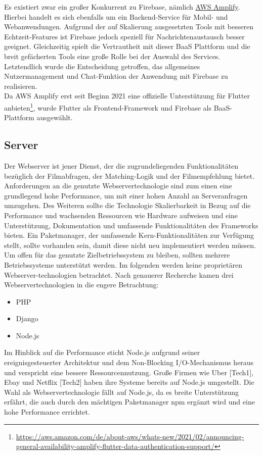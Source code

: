 Es existiert zwar ein großer Konkurrent zu Firebase, nämlich \href{https://docs.amplify.aws/}{AWS Amplify}.
Hierbei handelt es sich ebenfalls um ein Backend-Service für Mobil- und Webanwendungen. 
Aufgrund der auf Skalierung ausgesetzten Tools mit besseren Echtzeit-Features ist Firebase jedoch speziell für Nachrichtenaustausch besser geeignet.
Gleichzeitig spielt die Vertrautheit mit dieser BaaS Plattform und die breit gefächerten Tools eine große Rolle bei der Auswahl des Services.
Letztendlich wurde die Entscheidung getroffen, das allgemeines Nutzermanagement und Chat-Funktion der Anwendung mit Firebase zu realisieren.\\
Da AWS Amplify erst seit Beginn 2021 eine offizielle Unterstützung für Flutter anbieten\footnote{\url{https://aws.amazon.com/de/about-aws/whats-new/2021/02/announcing-general-availability-amplify-flutter-data-authentication-support/}}, wurde Flutter als Frontend-Framework und Firebase als BaaS-Plattform ausgewählt.

\subsection{Server}
Der Webserver ist jener Dienst,  der die zugrundeliegenden Funktionalitäten bezüglich der Filmabfragen, der Matching-Logik und der Filmempfehlung bietet. 
Anforderungen an die genutzte Webservertechnologie sind zum einen eine grundlegend hohe Performance, um mit einer hohen Anzahl an Serveranfragen umzugehen. Des Weiteren sollte die Technologie Skalierbarkeit in Bezug auf die Performance und wachsenden Ressourcen wie Hardware aufweisen und eine Unterstützung, Dokumentation und umfassende Funktionalitäten des Frameworks bieten. 
Ein Paketmanager, der umfassende Kern-Funktionalitäten zur Verfügung stellt, sollte vorhanden sein, damit diese nicht neu implementiert werden müssen. Um offen für das genutzte Zielbetriebssystem zu bleiben, sollten mehrere Betriebssysteme unterstützt werden. 
Im folgenden werden keine proprietären Webserver-technologien betrachtet.
\newline
Nach genauerer Recherche kamen drei Webservertechnologien in die engere Betrachtung:

\begin{itemize}
	\item PHP
	\item Django
	\item Node.js
\end{itemize} 

Im Hinblick auf die Performance sticht Node.js aufgrund seiner ereignisgesteuerter Architektur  und dem Non-Blocking I/O-Mechanismus heraus und verspricht eine bessere Ressourcennutzung. 
\newline
Große Firmen wie Uber [Tech1], Ebay und Netflix [Tech2] haben ihre Systeme bereits auf Node.js umgestellt. Die Wahl als Webservertechnologie fällt auf Node.js, da es breite Unterstützung erfährt, die auch durch den mächtigen Paketmanager npm ergänzt wird und eine hohe Performance errichtet.


